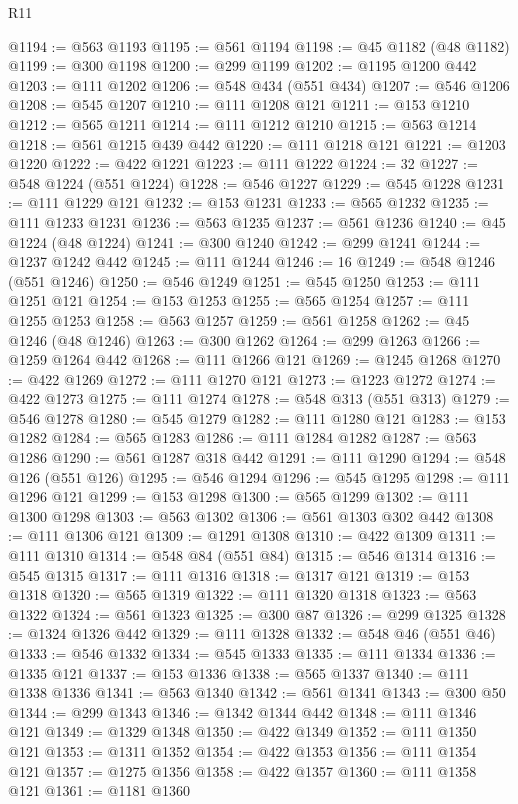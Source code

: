 \begin{lexlean}{R11}
\begin{coremodule}
{{{{{{{{{{{{{{{{{{{{{{{{{{{{{{{{{{{{{{{{{{{{{{{{{{{{{{{{{{{{{{{{{{{{{{{{{{{{{{{{{{@1194 := @563 @1193
@1195 := @561 @1194
@1198 := @45 @1182 (@48 @1182)
@1199 := @300 @1198
@1200 := @299 @1199
@1202 := @1195 @1200 @442
@1203 := @111 @1202
@1206 := @548 @434 (@551 @434)
@1207 := @546 @1206
@1208 := @545 @1207
@1210 := @111 @1208 @121
@1211 := @153 @1210
@1212 := @565 @1211
@1214 := @111 @1212 @1210
@1215 := @563 @1214
@1218 := @561 @1215 @439 @442
@1220 := @111 @1218 @121
@1221 := @1203 @1220
@1222 := @422 @1221
@1223 := @111 @1222
@1224 := 32
@1227 := @548 @1224 (@551 @1224)
@1228 := @546 @1227
@1229 := @545 @1228
@1231 := @111 @1229 @121
@1232 := @153 @1231
@1233 := @565 @1232
@1235 := @111 @1233 @1231
@1236 := @563 @1235
@1237 := @561 @1236
@1240 := @45 @1224 (@48 @1224)
@1241 := @300 @1240
@1242 := @299 @1241
@1244 := @1237 @1242 @442
@1245 := @111 @1244
@1246 := 16
@1249 := @548 @1246 (@551 @1246)
@1250 := @546 @1249
@1251 := @545 @1250
@1253 := @111 @1251 @121
@1254 := @153 @1253
@1255 := @565 @1254
@1257 := @111 @1255 @1253
@1258 := @563 @1257
@1259 := @561 @1258
@1262 := @45 @1246 (@48 @1246)
@1263 := @300 @1262
@1264 := @299 @1263
@1266 := @1259 @1264 @442
@1268 := @111 @1266 @121
@1269 := @1245 @1268
@1270 := @422 @1269
@1272 := @111 @1270 @121
@1273 := @1223 @1272
@1274 := @422 @1273
@1275 := @111 @1274
@1278 := @548 @313 (@551 @313)
@1279 := @546 @1278
@1280 := @545 @1279
@1282 := @111 @1280 @121
@1283 := @153 @1282
@1284 := @565 @1283
@1286 := @111 @1284 @1282
@1287 := @563 @1286
@1290 := @561 @1287 @318 @442
@1291 := @111 @1290
@1294 := @548 @126 (@551 @126)
@1295 := @546 @1294
@1296 := @545 @1295
@1298 := @111 @1296 @121
@1299 := @153 @1298
@1300 := @565 @1299
@1302 := @111 @1300 @1298
@1303 := @563 @1302
@1306 := @561 @1303 @302 @442
@1308 := @111 @1306 @121
@1309 := @1291 @1308
@1310 := @422 @1309
@1311 := @111 @1310
@1314 := @548 @84 (@551 @84)
@1315 := @546 @1314
@1316 := @545 @1315
@1317 := @111 @1316
@1318 := @1317 @121
@1319 := @153 @1318
@1320 := @565 @1319
@1322 := @111 @1320 @1318
@1323 := @563 @1322
@1324 := @561 @1323
@1325 := @300 @87
@1326 := @299 @1325
@1328 := @1324 @1326 @442
@1329 := @111 @1328
@1332 := @548 @46 (@551 @46)
@1333 := @546 @1332
@1334 := @545 @1333
@1335 := @111 @1334
@1336 := @1335 @121
@1337 := @153 @1336
@1338 := @565 @1337
@1340 := @111 @1338 @1336
@1341 := @563 @1340
@1342 := @561 @1341
@1343 := @300 @50
@1344 := @299 @1343
@1346 := @1342 @1344 @442
@1348 := @111 @1346 @121
@1349 := @1329 @1348
@1350 := @422 @1349
@1352 := @111 @1350 @121
@1353 := @1311 @1352
@1354 := @422 @1353
@1356 := @111 @1354 @121
@1357 := @1275 @1356
@1358 := @422 @1357
@1360 := @111 @1358 @121
@1361 := @1181 @1360
}}}}}}}}}}}}}}}}}}}}}}}}}}}}}}}}}}}}}}}}}}}}}}}}}}}}}}}}}}}}}}}}}}}}}}}}}}}}}}}}}}
\end{coremodule}
\end{lexlean}
